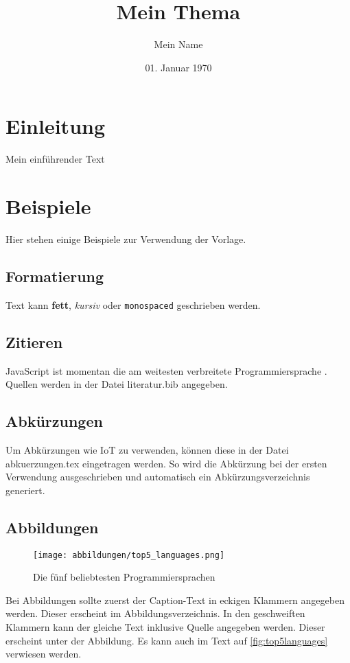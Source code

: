 \documentclass[a4paper,12pt]{scrreprt}
\title{Mein Thema}
\author{Mein Name}
\date{01. Januar 1970}
\begin{document}

\tableofcontents
\listoffigures
\listoftables
\listoflistings

\clearpage

\onehalfspacing
\chapter{Einleitung}
Mein einführender Text

\chapter{Beispiele}
Hier stehen einige Beispiele zur Verwendung der Vorlage.

\section{Formatierung}
Text kann \textbf{fett}, \textit{kursiv} oder \texttt{monospaced} geschrieben werden.

\section{Zitieren}
JavaScript ist momentan die am weitesten verbreitete Programmiersprache \parencite{stackOverflowSurvey}.
Quellen werden in der Datei literatur.bib angegeben.

\section{Abkürzungen}
Um Abkürzungen wie \ac{IoT} zu verwenden, können diese in der Datei abkuerzungen.tex eingetragen werden.
So wird die Abkürzung bei der ersten Verwendung ausgeschrieben und automatisch ein Abkürzungsverzeichnis generiert.

\section{Abbildungen}
\begin{figure}[h]
    \centering
    \texttt{[image: abbildungen/top5\_languages.png]}
    \caption[Die fünf beliebtesten Programmiersprachen]{Die fünf beliebtesten Programmiersprachen \parencite{stackOverflowSurvey}}
    \label{fig:top5languages}
\end{figure}

Bei Abbildungen sollte zuerst der Caption-Text in eckigen Klammern angegeben werden.
Dieser erscheint im Abbildungsverzeichnis.
In den geschweiften Klammern kann der gleiche Text inklusive Quelle angegeben werden.
Dieser erscheint unter der Abbildung.
Es kann auch im Text auf \autoref{fig:top5languages} verwiesen werden.
\end{document}
